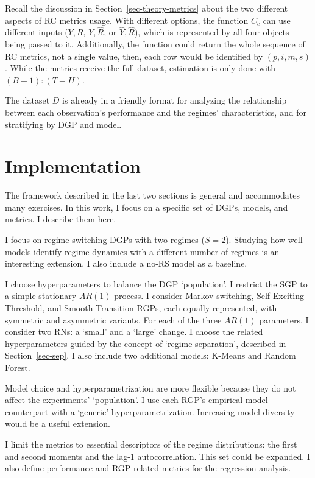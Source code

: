 \documentclass[
  letterpaper,
  DIV=11,
  numbers=noendperiod]{scrartcl}
\numberwithin{equation}{section}
\numberwithin{table}{section}
\numberwithin{figure}{section}
\let\oldsection\section
\renewcommand\section{\clearpage\oldsection}
\begin{document}
Recall the discussion in Section~\ref{sec-theory-metrics} about the two
different aspects of RC metrics usage. With different options, the
function \(C_c\) can use different inputs (\(Y, R\), \(Y, \hat{R}\), or
\(\hat{Y}, \hat{R}\)), which is represented by all four objects being
passed to it. Additionally, the function could return the whole sequence
of RC metrics, not a single value, then, each row would be identified by
\((p, i, m, s)\). While the metrics receive the full dataset, estimation
is only done with \((B + 1):(T - H)\).

The dataset \(D\) is already in a friendly format for analyzing the
relationship between each observation's performance and the regimes'
characteristics, and for stratifying by DGP and model.

\section{Implementation}\label{sec-impl}

The framework described in the last two sections is general and
accommodates many exercises. In this work, I focus on a specific set of
DGPs, models, and metrics. I describe them here.

I focus on regime-switching DGPs with two regimes (\(S = 2\)). Studying
how well models identify regime dynamics with a different number of
regimes is an interesting extension. I also include a no-RS model as a
baseline.

I choose hyperparameters to balance the DGP `population'. I restrict the
SGP to a simple stationary \(AR(1)\) process. I consider
Markov-switching, Self-Exciting Threshold, and Smooth Transition RGPs,
each equally represented, with symmetric and asymmetric variants. For
each of the three \(AR(1)\) parameters, I consider two RNs: a `small'
and a `large' change. I choose the related hyperparameters guided by the
concept of `regime separation', described in Section~\ref{sec-sep}. I
also include two additional models: K-Means and Random Forest.

Model choice and hyperparametrization are more flexible because they do
not affect the experiments' `population'. I use each RGP's empirical
model counterpart with a `generic' hyperparametrization. Increasing
model diversity would be a useful extension.

I limit the metrics to essential descriptors of the regime
distributions: the first and second moments and the lag-1
autocorrelation. This set could be expanded. I also define performance
and RGP-related metrics for the regression analysis.
\end{document}
